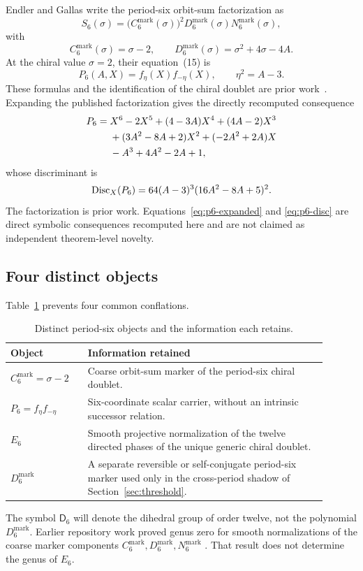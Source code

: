 Endler and Gallas write the period-six orbit-sum factorization as
\[
 S_6(\sigma)=
 \bigl(C_6^{\mathrm{mark}}(\sigma)\bigr)^2
 D_6^{\mathrm{mark}}(\sigma)N_6^{\mathrm{mark}}(\sigma),
\]
with
\[
 C_6^{\mathrm{mark}}(\sigma)=\sigma-2,
 \qquad
 D_6^{\mathrm{mark}}(\sigma)=\sigma^2+4\sigma-4A.
\]
At the chiral value $\sigma=2$, their equation~(15) is
\begin{equation}\label{eq:published-p6}
 P_6(A,X)=f_\eta(X)f_{-\eta}(X),
 \qquad \eta^2=A-3.
\end{equation}
These formulas and the identification of the chiral doublet are prior
work~\cite[Sec.~3, Eqs.~(11)--(15)]{endlergallas2006chiral}.  Expanding the
published factorization
gives the directly recomputed consequence
\begin{align}\label{eq:p6-expanded}
P_6={}&X^6-2X^5+(4-3A)X^4+(4A-2)X^3\notag\\
&+(3A^2-8A+2)X^2+(-2A^2+2A)X\notag\\
&-A^3+4A^2-2A+1,
\end{align}
whose discriminant is
\begin{equation}\label{eq:p6-disc}
 \operatorname{Disc}_X(P_6)=64(A-3)^3(16A^2-8A+5)^2.
\end{equation}
The factorization is prior work.  Equations~\eqref{eq:p6-expanded} and
\eqref{eq:p6-disc} are direct symbolic consequences recomputed here and are
not claimed as independent theorem-level novelty.

\subsection{Four distinct objects}

Table~\ref{tab:object-boundaries} prevents four common conflations.
\begin{table}[htbp]
\centering
\begin{tabular}{p{0.22\linewidth}p{0.68\linewidth}}
\toprule
Object & Information retained \\
\midrule
$C_6^{\mathrm{mark}}=\sigma-2$
 & Coarse orbit-sum marker of the period-six chiral doublet. \\
$P_6=f_\eta f_{-\eta}$
 & Six-coordinate scalar carrier, without an intrinsic successor relation. \\
$E_6$
 & Smooth projective normalization of the twelve directed phases of the
 unique generic chiral doublet. \\
$D_6^{\mathrm{mark}}$
 & A separate reversible or self-conjugate period-six marker used only in
 the cross-period shadow of Section~\ref{sec:threshold}. \\
\bottomrule
\end{tabular}
\caption{Distinct period-six objects and the information each retains.}
\label{tab:object-boundaries}
\end{table}
The symbol $\mathsf D_6$ will denote the dihedral group of order twelve, not
the polynomial $D_6^{\mathrm{mark}}$.  Earlier repository work proved genus
zero for smooth normalizations of the coarse marker components
$C_6^{\mathrm{mark}},D_6^{\mathrm{mark}},N_6^{\mathrm{mark}}$
\cite[Sec.~4]{hcsc12c}.  That result does not determine the genus of $E_6$.

